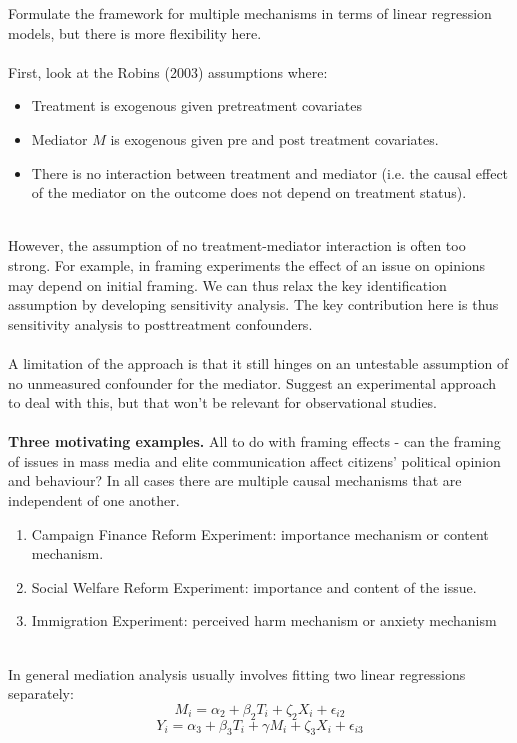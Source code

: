 \documentclass{article}
\begin{document}
	Formulate the framework for multiple mechanisms in terms of linear regression models, but there is more flexibility here. 
	\\~\\
	First, look at the Robins (2003) assumptions where:
	\begin{itemize}
		\item Treatment is exogenous given pretreatment covariates
		\item Mediator $M$ is exogenous given pre and post treatment covariates. 
		\item There is no interaction between treatment and mediator (i.e. the causal effect of the mediator on the outcome does not depend on treatment status).
	\end{itemize}
	~\\
	However, the assumption of no treatment-mediator interaction is often too strong. For example, in framing experiments the effect of an issue on opinions may depend on initial framing. We can thus relax the key identification assumption by developing sensitivity analysis. The key contribution here is thus sensitivity analysis to posttreatment confounders. 
	\\~\\
	A limitation of the approach is that it still hinges on an untestable assumption of no unmeasured confounder for the mediator. Suggest an experimental approach to deal with this, but that won't be relevant for observational studies. 
	\\~\\
	\textbf{Three motivating examples.} All to do with framing effects - can the framing of issues in mass media and elite communication affect citizens' political opinion and behaviour? In all cases there are multiple causal mechanisms that are independent of one another. 
	\begin{enumerate}
		\item Campaign Finance Reform Experiment: importance mechanism or content mechanism. 
		\item Social Welfare Reform Experiment: importance and content of the issue.
		\item Immigration Experiment: perceived harm mechanism or anxiety mechanism
	\end{enumerate}
	~\\
	In general mediation analysis usually involves fitting two linear regressions separately:
	$$
	M_i = \alpha_2 + \beta_2 T_i + \zeta_2 X_i + \epsilon_{i2}
	$$
	$$
	Y_i = \alpha_3 + \beta_3 T_i + \gamma M_i +  \zeta_3 X_i + \epsilon_{i3}
	$$
\end{document}
